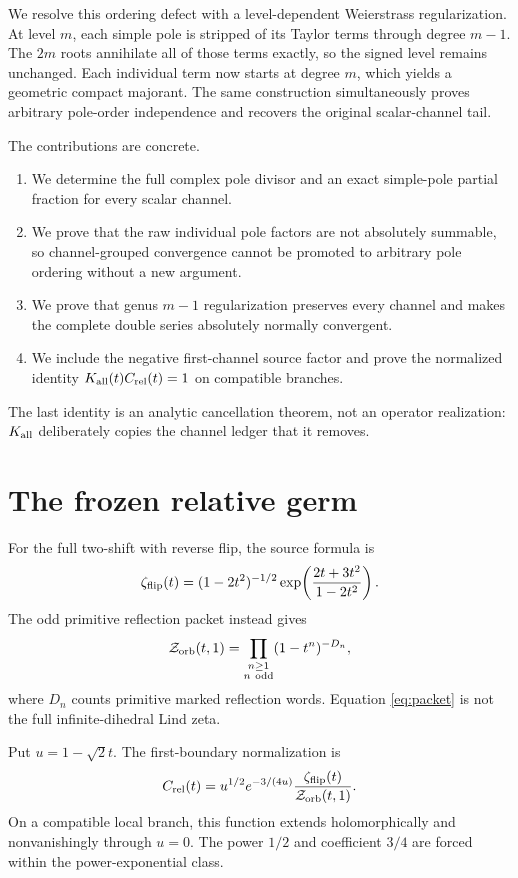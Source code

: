 \documentclass[11pt]{article}
\newcommand{\Zorb}{\mathcal Z_{\rm orb}}
\newcommand{\zflip}{\zeta_{\rm flip}}
\newcommand{\Crel}{C_{\rm rel}}
\newcommand{\Kall}{K_{\rm all}}
\begin{document}
We resolve this ordering defect with a level-dependent Weierstrass
regularization.  At level $m$, each simple pole is stripped of its Taylor
terms through degree $m-1$.  The $2m$ roots annihilate all of those terms
exactly, so the signed level remains unchanged.  Each individual term now
starts at degree $m$, which yields a geometric compact majorant.  The same
construction simultaneously proves arbitrary pole-order independence and
recovers the original scalar-channel tail.

The contributions are concrete.
\begin{enumerate}
\item We determine the full complex pole divisor and an exact simple-pole
partial fraction for every scalar channel.
\item We prove that the raw individual pole factors are not absolutely
summable, so channel-grouped convergence cannot be promoted to arbitrary
pole ordering without a new argument.
\item We prove that genus $m-1$ regularization preserves every channel and
makes the complete double series absolutely normally convergent.
\item We include the negative first-channel source factor and prove the
normalized identity $\Kall(t)\Crel(t)=1$ on compatible branches.
\end{enumerate}
The last identity is an analytic cancellation theorem, not an operator
realization: $\Kall$ deliberately copies the channel ledger that it removes.

\section{The frozen relative germ}

For the full two-shift with reverse flip, the source formula is
\begin{equation}\label{eq:lind}
 \zflip(t)=(1-2t^2)^{-1/2}
 \exp\!\left(\frac{2t+3t^2}{1-2t^2}\right).
\end{equation}
The odd primitive reflection packet instead gives
\begin{equation}\label{eq:packet}
 \Zorb(t,1)=\prod_{\substack{n\ge1\\n\ \mathrm{odd}}}(1-t^n)^{-D_n},
\end{equation}
where $D_n$ counts primitive marked reflection words.  Equation
\eqref{eq:packet} is not the full infinite-dihedral Lind zeta.

Put $u=1-\sqrt2t$.  The first-boundary normalization is
\begin{equation}\label{eq:relative}
 \Crel(t)=u^{1/2}e^{-3/(4u)}\frac{\zflip(t)}{\Zorb(t,1)}.
\end{equation}
On a compatible local branch, this function extends holomorphically and
nonvanishingly through $u=0$.  The power $1/2$ and coefficient $3/4$ are
forced within the power-exponential class.
\end{document}

